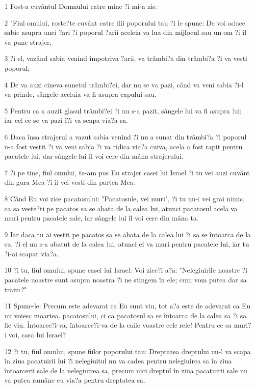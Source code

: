 \par 1 Fost-a cuvântul Domnului catre mine ?i mi-a zis:
\par 2 "Fiul omului, roste?te cuvânt catre fiii poporului tau ?i le spune: De voi aduce sabie asupra unei ?ari ?i poporul ?arii aceleia va lua din mijlocul sau un om ?i îl va pune strajer,
\par 3 ?i el, vazând sabia venind împotriva ?arii, va trâmbi?a din trâmbi?a ?i va vesti poporul;
\par 4 De va auzi cineva sunetul trâmbi?ei, dar nu se va pazi, când va veni sabia ?i-l va prinde, sângele aceluia va fi asupra capului sau.
\par 5 Pentru ca a auzit glasul trâmbi?ei ?i nu s-a pazit, sângele lui va fi asupra lui; iar cel ce se va pazi î?i va scapa via?a sa.
\par 6 Daca însa strajerul a vazut sabia venind ?i nu a sunat din trâmbi?a ?i poporul n-a fost vestit ?i va veni sabia ?i va ridica via?a cuiva, acela a fost rapit pentru pacatele lui, dar sângele lui îl voi cere din mâna strajerului.
\par 7 ?i pe tine, fiul omului, te-am pus Eu strajer casei lui Israel ?i tu vei auzi cuvânt din gura Mea ?i îl vei vesti din partea Mea.
\par 8 Când Eu voi zice pacatosului: "Pacatosule, vei muri", ?i tu nu-i vei grai nimic, ca sa veste?ti pe pacatos sa se abata de la calea lui, atunci pacatosul acela va muri pentru pacatele sale, iar sângele lui îl voi cere din mâna ta.
\par 9 Iar daca tu ai vestit pe pacatos sa se abata de la calea lui ?i sa se întoarca de la ea, ?i el nu s-a abatut de la calea lui, atunci el va muri pentru pacatele lui, iar tu ?i-ai scapat via?a.
\par 10 ?i tu, fiul omului, spune casei lui Israel: Voi zice?i a?a: "Nelegiuirile noastre ?i pacatele noastre sunt asupra noastra ?i ne stingem în ele; cum vom putea dar sa traim?"
\par 11 Spune-le: Precum este adevarat ca Eu sunt viu, tot a?a este de adevarat ca Eu nu voiesc moartea. pacatosului, ci ca pacatosul sa se întoarca de la calea sa ?i sa fie viu. Întoarce?i-va, întoarce?i-va de la caile voastre cele rele! Pentru ce sa muri?i voi, casa lui Israel?
\par 12 ?i tu, fiul omului, spune fiilor poporului tau: Dreptatea dreptului nu-l va scapa în ziua pacatuirii lui ?i nelegiuitul nu va cadea pentru nelegiuirea sa în ziua întoarcerii sale de la nelegiuirea sa, precum nici dreptul în ziua pacatuirii sale nu va putea ramâne cu via?a pentru dreptatea sa.
